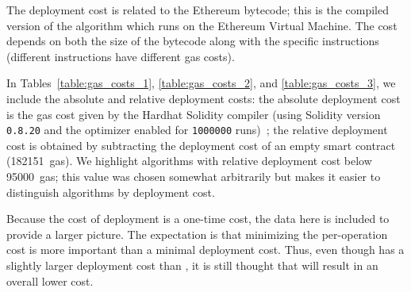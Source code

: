 The deployment cost is related to the Ethereum bytecode;
this is the compiled version of the algorithm
which runs on the Ethereum Virtual Machine.
The cost depends on both the size of the bytecode
along with the specific instructions
(different instructions have different gas costs).

In Tables~\ref{table:gas_costs_1}, \ref{table:gas_costs_2},
and \ref{table:gas_costs_3},
we include the absolute and relative deployment costs:
the absolute deployment cost is the gas cost given
by the Hardhat Solidity compiler
(using Solidity version \texttt{0.8.20}
and the optimizer enabled for \texttt{1000000} runs)~\cite{hardhat};
the relative deployment cost is obtained by subtracting
the deployment cost of an empty smart contract
(182151~gas).
We highlight algorithms with relative deployment cost below 95000~gas;
this value was chosen somewhat arbitrarily
but makes it easier to distinguish algorithms
by deployment cost.

Because the cost of deployment is a one-time cost,
the data here is included to provide a larger picture.
The expectation is that minimizing the per-operation cost
is more important than a minimal deployment cost.
Thus, even though \UnrolledThree{} has a slightly larger deployment cost
than \OpenZeppelinTwo{},
it is still thought that \UnrolledThree{} will result
in an overall lower cost.
